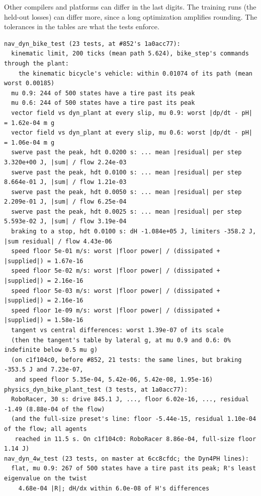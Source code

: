 \documentclass[11pt]{article}
\theoremstyle{remark}
\begin{document}
Other compilers and platforms can differ in the last digits. The training runs (the held-out losses)
can differ more, since a long optimization amplifies rounding. The tolerances in the tables are what
the tests enforce.
\begin{center}
\begin{minipage}{0.98\linewidth}
\scriptsize
\begin{verbatim}
nav_dyn_bike_test (23 tests, at #852's 1a0acc77):
  kinematic limit, 200 ticks (mean path 5.624), bike_step's commands through the plant:
    the kinematic bicycle's vehicle: within 0.01074 of its path (mean worst 0.00185)
  mu 0.9: 244 of 500 states have a tire past its peak
  mu 0.6: 244 of 500 states have a tire past its peak
  vector field vs dyn_plant at every slip, mu 0.9: worst |dp/dt - pH| = 1.62e-04 m g
  vector field vs dyn_plant at every slip, mu 0.6: worst |dp/dt - pH| = 1.06e-04 m g
  swerve past the peak, hdt 0.0200 s: ... mean |residual| per step 3.320e+00 J, |sum| / flow 2.24e-03
  swerve past the peak, hdt 0.0100 s: ... mean |residual| per step 8.664e-01 J, |sum| / flow 1.21e-03
  swerve past the peak, hdt 0.0050 s: ... mean |residual| per step 2.209e-01 J, |sum| / flow 6.25e-04
  swerve past the peak, hdt 0.0025 s: ... mean |residual| per step 5.593e-02 J, |sum| / flow 3.19e-04
  braking to a stop, hdt 0.0100 s: dH -1.084e+05 J, limiters -358.2 J, |sum residual| / flow 4.43e-06
  speed floor 5e-01 m/s: worst |floor power| / (dissipated + |supplied|) = 1.67e-16
  speed floor 5e-02 m/s: worst |floor power| / (dissipated + |supplied|) = 2.16e-16
  speed floor 5e-03 m/s: worst |floor power| / (dissipated + |supplied|) = 2.16e-16
  speed floor 1e-09 m/s: worst |floor power| / (dissipated + |supplied|) = 1.58e-16
  tangent vs central differences: worst 1.39e-07 of its scale
  (then the tangent's table by lateral g, at mu 0.9 and 0.6: 0% indefinite below 0.5 mu g)
  (on c1f104c0, before #852, 21 tests: the same lines, but braking -353.5 J and 7.23e-07,
   and speed floor 5.35e-04, 5.42e-06, 5.42e-08, 1.95e-16)
physics_dyn_bike_plant_test (3 tests, at 1a0acc77):
  RoboRacer, 30 s: drive 845.1 J, ..., floor 6.02e-16, ..., residual -1.49 (8.88e-04 of the flow)
  (and the full-size preset's line: floor -5.44e-15, residual 1.10e-04 of the flow; all agents
   reached in 11.5 s. On c1f104c0: RoboRacer 8.86e-04, full-size floor 1.14 J)
nav_dyn_4w_test (23 tests, on master at 6cc8cfdc; the Dyn4PH lines):
  flat, mu 0.9: 267 of 500 states have a tire past its peak; R's least eigenvalue on the twist
    4.68e-04 |R|; dH/dx within 6.0e-08 of H's differences

\end{verbatim}
\end{minipage}
\end{center}
\end{document}
